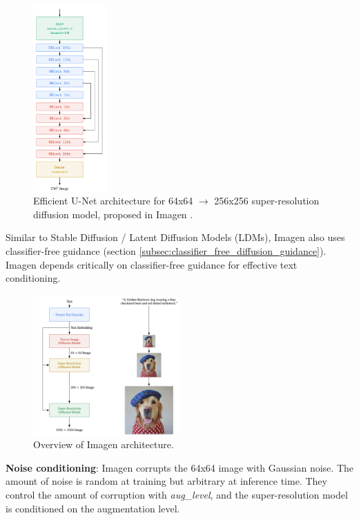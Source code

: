 \begin{figure}
    \centering
    \includegraphics[width=0.25\textwidth]{images/imagen/efficient_unet.png}
    \caption{Efficient U-Net architecture for 64x64 $\rightarrow$ 256x256 super-resolution diffusion model, proposed in Imagen \cite{imagen}.}
    \label{fig:imagen_efficient_unet}
\end{figure}

Similar to Stable Diffusion / Latent Diffusion Models (LDMs), Imagen also uses classifier-free guidance \cite{classifier_free_guidance} (section \ref{subsec:classifier_free_diffusion_guidance}). Imagen depends critically on classifier-free guidance for effective text conditioning.

\begin{figure}
    \centering
    \includegraphics[width=0.5\textwidth]{images/imagen/architecture.png}
    \caption{Overview of Imagen architecture.}
    \label{fig:imagen_architecture}
\end{figure}

\textbf{Noise conditioning}: Imagen corrupts the 64x64 image with Gaussian noise. The amount of noise is random at training but arbitrary at inference time. They control the amount of corruption with \textit{aug\_level}, and the super-resolution model is conditioned on the augmentation level.

